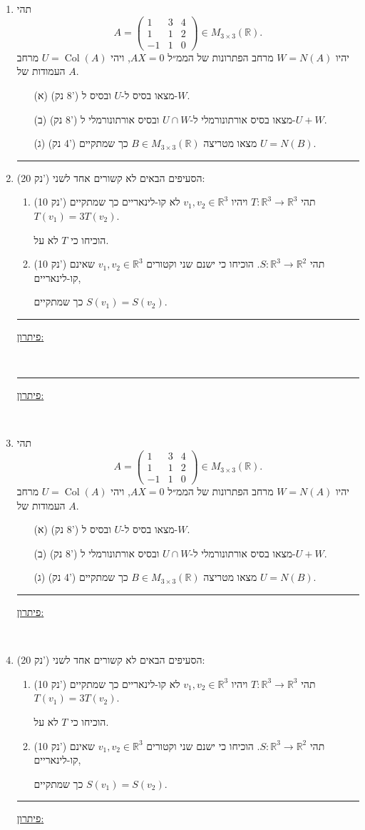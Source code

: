 \documentclass[12pt, a4paper]{article}
\newcommand{\rr}{\mathbb{R}}
\newcommand{\points}[1]{(#1 נק') }
\begin{document}
\begin{enumerate}
{\begin{enumerate}
\item[(א)] (5 נק') מצאו את המטריצה $A=[T]^E_E$ כאשר $E$ הוא הבסיס הסטנדרטי של $\mathbb{R}^3$ וחשבו את $\det(A)$.
\item[(ב)] (5 נק') מצאו עבור כל $a,b\in\mathbb{R}$ בסיס ל-$\operatorname{Im}(T)$.
\item[(ג)] (10 נק') מצאו לכל $0\le k\le 2$ את כל הערכים $a,b\in\mathbb{R}$ עבורם $\dim(\ker(T))=k$ ומצאו בסיס של $\ker(T)$.
\end{enumerate}
}
\secondQ
\noindent\rule{\textwidth-30pt}{0.4pt}
\newcommand{\thirdQ}{
\item 
תהי
\[
A=
\begin{pmatrix}
1 & 3 & 4\\
1 & 1 & 2\\
-1 & 1 & 0
\end{pmatrix}
\in M_{3\times 3}(\mathbb{R}).
\]
יהיו $W=N(A)$ מרחב הפתרונות של הממ״ל $AX=0$, ויהי $U=\operatorname{Col}(A)$ מרחב העמודות של $A$.
\begin{enumerate}
\item[(א)] (8 נק') מצאו בסיס ל-$U$ ובסיס ל-$W$.
\item[(ב)] (8 נק') מצאו בסיס אורתונורמלי ל-$U\cap W$ ובסיס אורתונורמלי ל-$U+W$.
\item[(ג)] (4 נק') מצאו מטריצה $B\in M_{3\times 3}(\mathbb{R})$ כך שמתקיים $U=N(B)$.
\end{enumerate}
}
\thirdQ
\noindent\rule{\textwidth-30pt}{0.4pt}
\newcommand{\forthQ}{
    \item \points{20}
    הסעיפים הבאים לא קשורים אחד לשני:
    \begin{enumerate}
        \item\points{10} תהי
        $T:\rr^3\to\rr^3$ ויהיו 
        $v_1,v_2\in \rr^3$ לא קו-לינאריים כך שמתקיים
        $T(v_1) = 3T(v_2)$.

        הוכיחו כי
        $T$ לא על.
        \item\points{10} תהי $S:\rr^3\to\rr^2$.
        הוכיחו כי ישנם שני וקטורים
        $v_1,v_2\in\rr^3$ שאינם קו-לינאריים,
        
        כך שמתקיים
        $S(v_1) = S(v_2)$.
    \end{enumerate}
}\forthQ
\pagebreak
\setcounter{enumi}{0}
    \firstQ
\noindent\rule{\textwidth-30pt}{0.4pt}
\underline{פיתרון:}
    
    \pagebreak \ 
    \ 
    
    \pagebreak

    
    \secondQ
    \noindent\rule{\textwidth-30pt}{0.4pt}
    \underline{פיתרון:}


    \pagebreak \ \pagebreak

    \thirdQ
    \noindent\rule{\textwidth-30pt}{0.4pt}
    \underline{פיתרון:}


    \pagebreak \ \pagebreak

    \forthQ
    \noindent\rule{\textwidth-30pt}{0.4pt}
    \underline{פיתרון:}


    \pagebreak \ \pagebreak
\end{enumerate}
\end{document}
